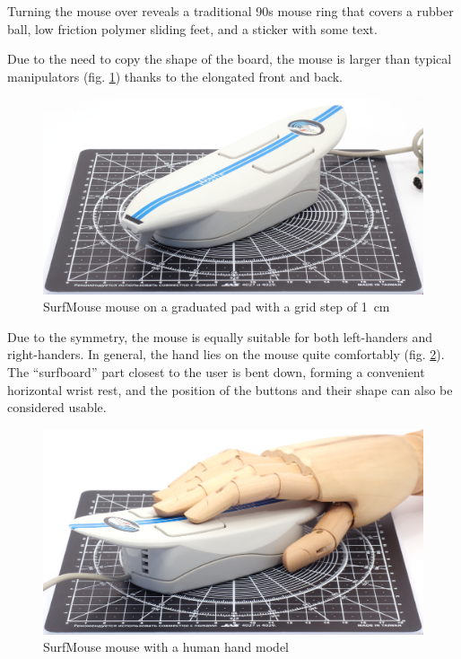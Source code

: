 \documentclass[11pt, a4paper]{article}
\begin{document}
Turning the mouse over reveals a traditional 90s mouse ring that covers a rubber ball, low friction polymer sliding feet, and a sticker with some text.

Due to the need to copy the shape of the board, the mouse is larger than typical manipulators (fig. \ref{fig:SurfMouseSize}) thanks to the elongated front and back.

\begin{figure}[h]
    \centering
    \includegraphics[scale=0.5]{2000_surf_mouse/size_30.jpg}
    \caption{SurfMouse mouse on a graduated pad with a grid step of 1~cm}
    \label{fig:SurfMouseSize}
\end{figure}

Due to the symmetry, the mouse is equally suitable for both left-handers and right-handers. In general, the hand lies on the mouse quite comfortably (fig. \ref{fig:SurfMouseHand}). The ``surfboard'' part closest to the user is bent down, forming a convenient horizontal wrist rest, and the position of the buttons and their shape can also be considered usable.

\begin{figure}[h]
    \centering
    \includegraphics[scale=0.5]{2000_surf_mouse/hand_30.jpg}
    \caption{SurfMouse mouse with a human hand model}
    \label{fig:SurfMouseHand}
\end{figure}
\end{document}
